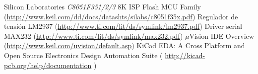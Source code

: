 \begin{thebibliography}{99}

 Silicon Laboratories \emph{C8051F351/2/3} 8K ISP Flash MCU Family (\url{http://www.keil.com/dd/docs/datashts/silabs/c8051f35x.pdf})
 Regulador de tensión LM2937 (\url{http://www.ti.com/lit/ds/symlink/lm2937.pdf})
 Driver serial MAX232 (\url{http://www.ti.com/lit/ds/symlink/max232.pdf})
 $\mu$Vision IDE Overview (\url{http://www.keil.com/uvision/default.asp})
 KiCad EDA: A Cross Platform and Open Source Electronics Design Automation Suite ( \url{http://kicad-pcb.org/help/documentation} )

\end{thebibliography}